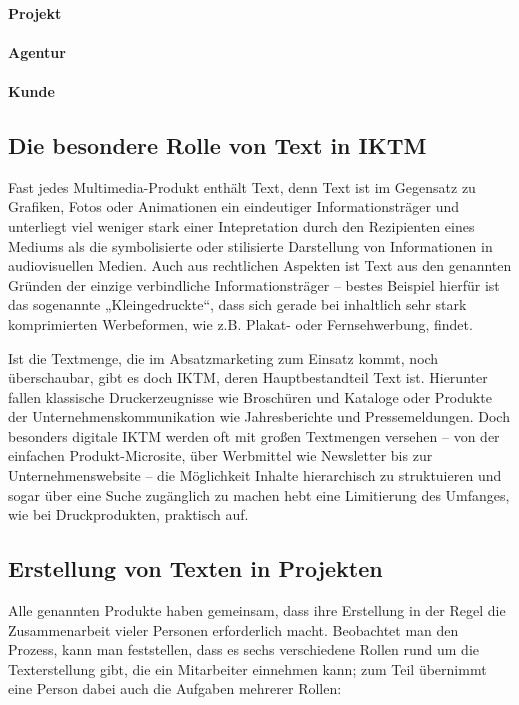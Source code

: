 \paragraph{Projekt} \TODO

\paragraph{Agentur} \TODO

\paragraph{Kunde} \TODO

\subsection{Die besondere Rolle von Text in \acl{IKTM}}

Fast jedes Multimedia-Produkt enthält Text, denn Text ist im Gegensatz zu Grafiken, Fotos oder Animationen ein eindeutiger Informationsträger und unterliegt viel weniger stark einer Intepretation durch den Rezipienten eines Mediums als die symbolisierte oder stilisierte Darstellung von Informationen in audiovisuellen Medien. Auch aus rechtlichen Aspekten ist Text aus den genannten Gründen der einzige verbindliche Informationsträger – bestes Beispiel hierfür ist das sogenannte „Kleingedruckte“, dass sich gerade bei inhaltlich sehr stark komprimierten Werbeformen, wie z.B. Plakat- oder Fernsehwerbung, findet.

Ist die Textmenge, die im Absatzmarketing zum Einsatz kommt, noch überschaubar, gibt es doch \ac{IKTM}, deren Hauptbestandteil Text ist. Hierunter fallen klassische Druckerzeugnisse wie Broschüren und Kataloge oder Produkte der Unternehmenskommunikation wie Jahresberichte und Pressemeldungen. Doch besonders digitale \ac{IKTM} werden oft mit großen Textmengen versehen – von der einfachen Produkt-Microsite, über Werbmittel wie Newsletter bis zur Unternehmenswebsite – die Möglichkeit Inhalte hierarchisch zu struktuieren und sogar über eine Suche zugänglich zu machen hebt eine Limitierung des Umfanges, wie bei Druckprodukten, praktisch auf.

\subsection{Erstellung von Texten in Projekten}

Alle genannten Produkte haben gemeinsam, dass ihre Erstellung in der Regel die Zusammenarbeit vieler Personen erforderlich macht. Beobachtet man den Prozess, kann man feststellen, dass es sechs verschiedene Rollen rund um die Texterstellung gibt, die ein Mitarbeiter einnehmen kann; zum Teil übernimmt eine Person dabei auch die Aufgaben mehrerer Rollen:

